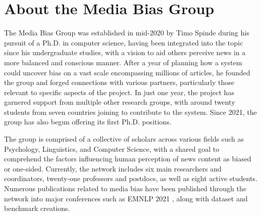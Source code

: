 \section{About the Media Bias Group}

The Media Bias Group \cite{media-bias-group} was established in mid-2020 by Timo Spinde during his pursuit of a Ph.D. in computer science, having been integrated into the topic since his undergraduate studies, with a vision to aid others perceive news in a more balanced and conscious manner. After a year of planning how a system could uncover bias on a vast scale encompassing millions of articles, he founded the group and forged connections with various partners, particularly those relevant to specific aspects of the project. In just one year, the project has garnered support from multiple other research groups, with around twenty students from seven countries joining to contribute to the system. Since 2021, the group has also begun offering its first Ph.D. positions.

The group is comprised of a collective of scholars across various fields such as Psychology, Linguistics, and Computer Science, with a shared goal to comprehend the factors influencing human perception of news content as biased or one-sided. Currently, the network includes six main researchers and coordinators, twenty-one professors and postdocs, as well as eight active students. Numerous publications related to media bias have been published through the network into major conferences such as EMNLP 2021 \cite{spinde-2021-babe}, along with dataset and benchmark creations.


